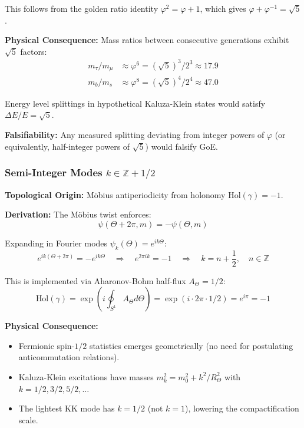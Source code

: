 \documentclass[12pt]{article}
\theoremstyle{definition}
\theoremstyle{plain}
\begin{document}
This follows from the golden ratio identity $\varphi^2 = \varphi + 1$, which gives $\varphi + \varphi^{-1} = \sqrt{5}$.

\textbf{Physical Consequence:} Mass ratios between consecutive generations exhibit $\sqrt{5}$ factors:
\begin{align}
m_\tau / m_\mu &\approx \varphi^6 = (\sqrt{5})^3 / 2^3 \approx 17.9 \\
m_b / m_s &\approx \varphi^8 = (\sqrt{5})^4 / 2^4 \approx 47.0
\end{align}

Energy level splittings in hypothetical Kaluza-Klein states would satisfy $\Delta E / E = \sqrt{5}$.

\textbf{Falsifiability:} Any measured splitting deviating from integer powers of $\varphi$ (or equivalently, half-integer powers of $\sqrt{5}$) would falsify GoE.

\subsubsection{Semi-Integer Modes $k \in \mathbb{Z} + 1/2$}

\textbf{Topological Origin:} M\"obius antiperiodicity from holonomy $\text{Hol}(\gamma) = -1$.

\textbf{Derivation:} The M\"obius twist enforces:
\begin{equation}
\psi(\Theta + 2\pi, m) = -\psi(\Theta, m)
\end{equation}

Expanding in Fourier modes $\psi_k(\Theta) = e^{ik\Theta}$:
\begin{equation}
e^{ik(\Theta + 2\pi)} = -e^{ik\Theta} \quad \Rightarrow \quad e^{2\pi i k} = -1 \quad \Rightarrow \quad k = n + \frac{1}{2}, \quad n \in \mathbb{Z}
\end{equation}

This is implemented via Aharonov-Bohm half-flux $A_\Theta = 1/2$:
\begin{equation}
\text{Hol}(\gamma) = \exp\left(i \oint_{S^1} A_\Theta d\Theta\right) = \exp(i \cdot 2\pi \cdot 1/2) = e^{i\pi} = -1
\end{equation}

\textbf{Physical Consequence:} 
\begin{itemize}
\item Fermionic spin-$1/2$ statistics emerges geometrically (no need for postulating anticommutation relations).
\item Kaluza-Klein excitations have masses $m_k^2 = m_0^2 + k^2/R_\Theta^2$ with $k = 1/2, 3/2, 5/2, \ldots$
\item The lightest KK mode has $k = 1/2$ (not $k=1$), lowering the compactification scale.
\end{itemize}
\end{document}

